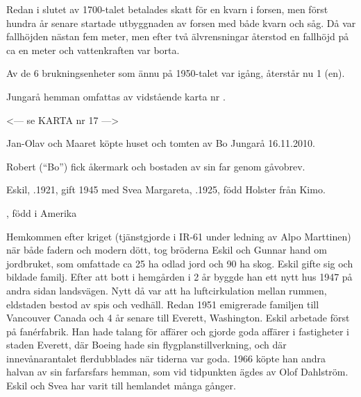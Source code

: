 Redan i slutet av 1700-talet betalades skatt för en kvarn i forsen, men först hundra år senare startade utbyggnaden av forsen med både kvarn och såg. Då var fallhöjden nästan fem meter, men efter två älvrensningar återstod en fallhöjd på ca en meter och vattenkraften var borta.

Av de 6 brukningsenheter som ännu på 1950-talet var igång, återstår nu 1 (en).


Jungarå hemman omfattas av vidstående karta nr .


<--- se KARTA nr 17 --->


%



%



%
Jan-Olav och Maaret köpte huset och tomten av Bo Jungarå 16.11.2010.\jhvspace{}


%
Robert (``Bo'') fick åkermark och bostaden av sin far genom gåvobrev.\jhvspace{}


%
Eskil, .1921, gift 1945 med Svea Margareta, .1925, född Holster från Kimo.
\begin{jhchildren}
  \item {}
  \item {}, född i Amerika
\end{jhchildren}

Hemkommen efter kriget (tjänstgjorde i IR-61 under ledning av Alpo 	Marttinen) när både fadern och modern dött, tog bröderna Eskil och Gunnar hand om jordbruket, som omfattade ca 25 ha odlad jord och 90 ha skog. Eskil gifte sig och bildade familj. Efter att bott i hemgården i 2 år byggde han ett nytt hus 1947 på andra sidan landsvägen. Nytt då var att ha luftcirkulation mellan rummen, eldstaden bestod av spis och vedhäll. Redan 1951 emigrerade familjen till Vancouver 	Canada och 4 år senare till Everett, Washington. Eskil arbetade först på fanérfabrik. Han hade talang för affärer och gjorde goda affärer i fastigheter i staden Everett, där Boeing hade sin flygplanstillverkning, och där innevånarantalet flerdubblades när tiderna var goda. 1966 köpte han andra halvan av sin farfarsfars hemman, som vid tidpunkten ägdes av Olof Dahlström. Eskil och Svea har varit till hemlandet många gånger.

